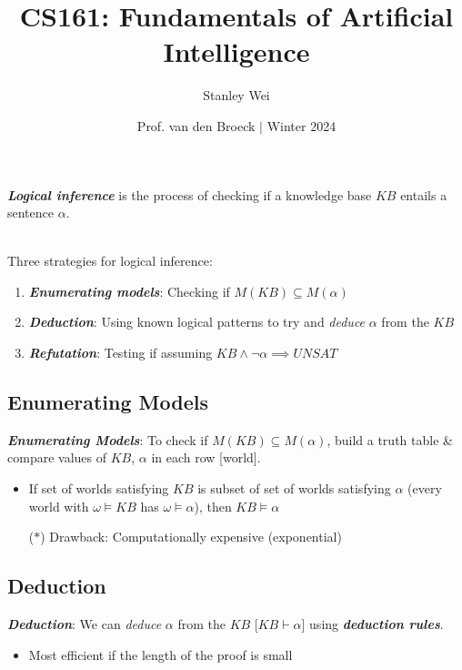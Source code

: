 \documentclass[12pt]{extarticle}
\title{CS161: Fundamentals of Artificial Intelligence}
\author{Stanley Wei}
\date{Prof. van den Broeck $\vert$ Winter 2024}
\theoremstyle{definition}
\theoremstyle{remark}
\newcommand{\pstart}[0]{\noindent}
\newcommand{\term}[1]{\noindent\textbf{\textit{#1}}}
\begin{document}
\term{Logical inference} is the process of checking if a knowledge base $KB$ entails a sentence $\alpha$. 

~\\ \pstart
Three strategies for logical inference: \begin{enumerate}
    \item \term{Enumerating models}: Checking if $M(KB)\subseteq M(\alpha)$
    \item \term{Deduction}: Using known logical patterns to try and \textit{deduce} $\alpha$ from the $KB$
    \item \term{Refutation}: Testing if assuming $KB\land\neg\alpha\implies UNSAT$
\end{enumerate} 

\subsection{Enumerating Models}
\term{Enumerating Models}: To check if $M(KB)\subseteq M(\alpha)$, build a truth table \& compare values of $KB$, $\alpha$ in each row [world]. \begin{itemize}
    \item If set of worlds satisfying $KB$ is subset of set of worlds satisfying $\alpha$ (every world with $\omega\models KB$ has $\omega\models\alpha$), then $KB\models\alpha$
    \item[($\ast$)] Drawback: Computationally expensive (exponential)
\end{itemize}

\subsection{Deduction}
\term{Deduction}: We can \textit{deduce} $\alpha$ from the $KB$ [$KB\vdash\alpha$] using \term{deduction rules}. \begin{itemize}
    \item Most efficient if the length of the proof is small
\end{itemize}
\end{document}
